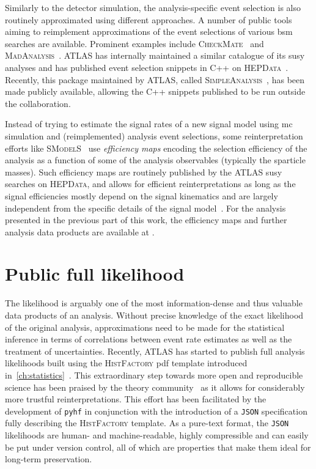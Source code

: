 Similarly to the detector simulation, the analysis-specific event selection is also routinely approximated using different approaches. A number of public tools aiming to reimplement approximations of the event selections of various \gls{bsm} searches are available. Prominent examples include \textsc{CheckMate}~\cite{Checkmate2:2016npn,Checkmate:2013wra} and \textsc{MadAnalysis}~\cite{MadAnalysis:2012fm}. ATLAS has internally maintained a similar catalogue of its \gls{susy} analyses and has published event selection snippets in C++ on \textsc{HEPData}~\cite{HEPData:2017ypu}. Recently, this package maintained by ATLAS, called \textsc{SimpleAnalysis}~\cite{simpleanalysis}, has been made publicly available, allowing the C++ snippets published to be run outside the collaboration.

Instead of trying to estimate the signal rates of a new signal model using \gls{mc} simulation and (reimplemented) analysis event selections, some reinterpretation efforts like \eg \textsc{SModelS}~\cite{SModelS1:2013mwa,SModelS2:2017neo} use \textit{efficiency maps} encoding the selection efficiency of the analysis as a function of some of the analysis observables (typically the sparticle masses). Such efficiency maps are routinely published by the ATLAS \gls{susy} searches on \textsc{HEPData}, and allows for efficient reinterpretations as long as the signal efficiencies mostly depend on the signal kinematics and are largely independent from the specific details of the signal model~\cite{SModelS1:2013mwa}. For the analysis presented in the previous part of this work, the efficiency maps and further analysis data products are available at \cite{HEPdata_1Lbb}. 

\section{Public full likelihood}\label{sec:full_likelihood}

The likelihood is arguably one of the most information-dense and thus valuable data products of an analysis. Without precise knowledge of the exact likelihood of the original analysis, approximations need to be made for the statistical inference \eg in terms of correlations between event rate estimates as well as the treatment of uncertainties. Recently, ATLAS has started to publish full analysis likelihoods built using the \textsc{HistFactory} \gls{pdf} template introduced in~\cref{ch:statistics}~\cite{ATL-PHYS-PUB-2019-029}. This extraordinary step towards more open and reproducible science has been praised by the theory community~\cite{REINP:2020pec} as it allows for considerably more trustful reinterpretations. This effort has been facilitated by the development of \texttt{pyhf} in conjunction with the introduction of a \texttt{JSON} specification fully describing the \textsc{HistFactory} template. As a pure-text format, the \texttt{JSON} likelihoods are human- and machine-readable, highly compressible and can easily be put under version control, all of which are properties that make them ideal for long-term preservation. 

